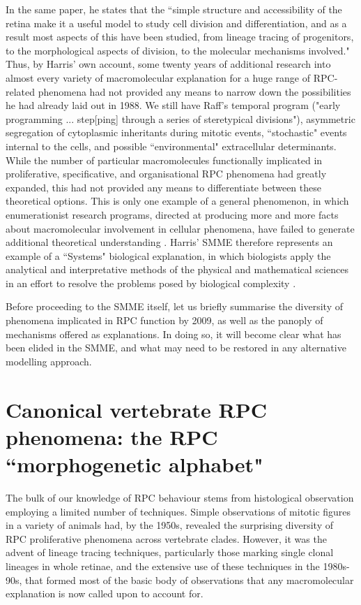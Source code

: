 In the same paper, he states that the ``simple structure and accessibility of the retina make it a useful model to study cell division and differentiation, and as a result most aspects of this have been studied, from lineage tracing of progenitors, to the morphological aspects of division, to the molecular mechanisms involved." Thus, by Harris' own account, some twenty years of additional research into almost every variety of macromolecular explanation for a huge range of RPC-related phenomena had not provided any means to narrow down the possibilities he had already laid out in 1988. We still have Raff's temporal program ("early programming ... step[ping] through a series of steretypical divisions"), asymmetric segregation of cytoplasmic inheritants during mitotic events, ``stochastic" events internal to the cells, and possible ``environmental" extracellular determinants. While the number of particular macromolecules functionally implicated in proliferative, specificative, and organisational RPC phenomena had greatly expanded, this had not provided any means to differentiate between these theoretical options. This is only one example of a general phenomenon, in which enumerationist research programs, directed at producing more and more facts about macromolecular involvement in cellular phenomena, have failed to generate additional theoretical understanding \cite{Kaneko2006}. Harris' SMME therefore represents an example of a ``Systems" biological explanation, in which biologists apply the analytical and interpretative methods of the physical and mathematical sciences in an effort to resolve the problems posed by biological complexity \cite{Morange2009}.

Before proceeding to the SMME itself, let us briefly summarise the diversity of phenomena implicated in RPC function by 2009, as well as the panoply of mechanisms offered as explanations. In doing so, it will become clear what has been elided in the SMME, and what may need to be restored in any alternative modelling approach.

\section{Canonical vertebrate RPC phenomena: the RPC ``morphogenetic alphabet"}

The bulk of our knowledge of RPC behaviour stems from histological observation employing a limited number of techniques. Simple observations of mitotic figures in a variety of animals had, by the 1950s, revealed the surprising diversity of RPC proliferative phenomena across vertebrate clades. However, it was the advent of lineage tracing techniques, particularly those marking single clonal lineages in whole retinae, and the extensive use of these techniques in the 1980s-90s, that formed most of the basic body of observations that any macromolecular explanation is now called upon to account for.

